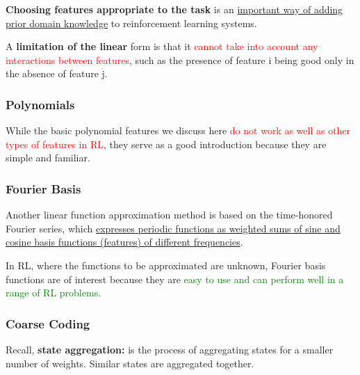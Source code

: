 \documentclass[12pt, a4paper]{article}
\begin{document}
\textbf{Choosing features appropriate to the task} is an \uline{important way of adding prior domain knowledge} to reinforcement learning systems.

A \textbf{limitation of the linear} form is that it \textcolor{red}{cannot take into account any interactions between features}, such as the presence of feature i being good only in the absence of feature j.





\subsubsection{Polynomials}\label{polynomials}

While the basic polynomial features we discuss here \textcolor{red}{do not work as well as other types of features in RL}, they serve as a good introduction because they are simple and familiar.




\subsubsection{Fourier Basis}\label{fourier-basis}

Another linear function approximation method is based on the time-honored Fourier series, which \uline{expresses periodic functions as weighted sums of sine and cosine basis functions (features) of different frequencies}.

In RL, where the functions to be approximated are unknown, Fourier basis functions are of interest because they are \textcolor{Green}{easy to use and can perform well in a range of RL problems}.



\subsubsection{Coarse Coding}\label{coarse-coding}

Recall, \textbf{state aggregation:} is the process of aggregating states for a smaller number of weights. Similar states are aggregated together.
\end{document}
